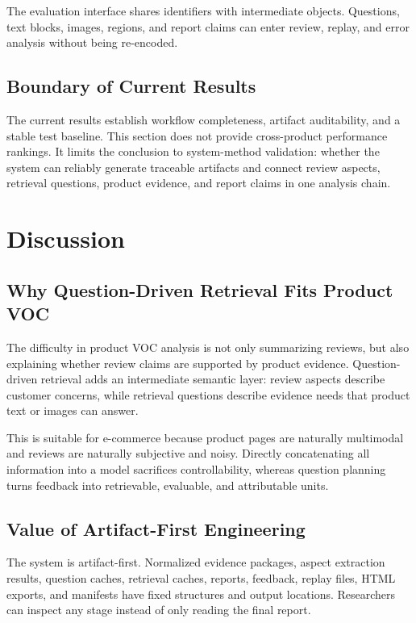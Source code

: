 \documentclass[11pt]{article}
\begin{document}
The evaluation interface shares identifiers with intermediate objects. Questions, text blocks, images, regions, and report claims can enter review, replay, and error analysis without being re-encoded.

\subsection{Boundary of Current Results}

The current results establish workflow completeness, artifact auditability, and a stable test baseline. This section does not provide cross-product performance rankings. It limits the conclusion to system-method validation: whether the system can reliably generate traceable artifacts and connect review aspects, retrieval questions, product evidence, and report claims in one analysis chain.

\section{Discussion}
\subsection{Why Question-Driven Retrieval Fits Product VOC}

The difficulty in product VOC analysis is not only summarizing reviews, but also explaining whether review claims are supported by product evidence. Question-driven retrieval adds an intermediate semantic layer: review aspects describe customer concerns, while retrieval questions describe evidence needs that product text or images can answer.

This is suitable for e-commerce because product pages are naturally multimodal and reviews are naturally subjective and noisy. Directly concatenating all information into a model sacrifices controllability, whereas question planning turns feedback into retrievable, evaluable, and attributable units.

\subsection{Value of Artifact-First Engineering}

The system is artifact-first. Normalized evidence packages, aspect extraction results, question caches, retrieval caches, reports, feedback, replay files, HTML exports, and manifests have fixed structures and output locations. Researchers can inspect any stage instead of only reading the final report.
\end{document}
